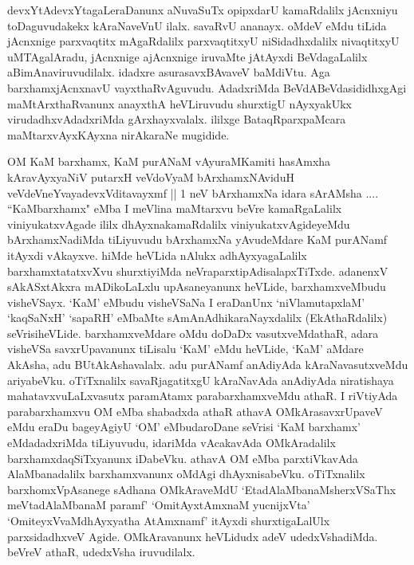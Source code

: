 \begin{artha}
devxYtAdevxYtagaLeraDanunx aNuvaSuTx opipxdarU kamaRdalilx jAcnxniyu toDaguvudakekx kAraNaveVnU ilalx. savaRvU ananayx. oMdeV eMdu tiLida jAcnxnige parxvaqtitx mAgaRdalilx parxvaqtitxyU niSidadhxdalilx nivaqtitxyU uMTAgalAradu, jAcnxnige \-ajAcnxnige iruvaMte jAtAyxdi BeVdagaLalilx aBimAnaviruvudilalx. idadxre asurasavxBAvaveV baMdiVtu. Aga barxhamxjAcnxnavU vayxthaRvAguvudu. AdadxriMda BeVdABeVdasididhxgAgi maMtArxthaRvanunx anayxthA heVLiruvudu shurxtigU nAyxyakUkx virudadhxvAdadxriMda gArxhayxvalalx. ililxge BataqRparxpaMcara maMtarxvAyxKAyxna nirAkaraNe mugidide.
\end{artha}


\begin{artha}
OM KaM barxhamx, KaM purANaM vAyuraMKamiti hasAmxha kAravAyxyaNiV putarxH veVdoVyaM bArxhamxNAviduH veVdeVneYvayadevxVditavayxmf || 1 neV bArxhamxNa idara sArAMsha .... ``KaMbarxhamx"  eMba I meVlina maMtarxvu beVre kamaRgaLalilx viniyukatxvAgade ililx dhAyxnakamaRdalilx viniyukatxvAgideyeMdu bArxhamxNadiMda tiLiyuvudu bArxhamxNa yAvudeMdare KaM purANamf itAyxdi vAkayxve. hiMde heVLida nAlukx adhAyxyagaLalilx barxhamxtatatxvXvu shurxtiyiMda neVraparxtipAdisalapxTiTxde. adanenxV sAkASxtAkxra mADikoLaLxlu upAsaneyanunx heVLide, barxhamxveMbudu visheVSayx. `KaM' eMbudu visheVSaNa I eraDanUnx `niVlamutapxlaM' `kaqSaNxH' `sapaRH' eMbaMte sAmAnAdhikaraNayxdalilx (EkAthaRdalilx) seVrisiheVLide. barxhamxveMdare oMdu doDaDx vasutxveMdathaR, adara visheVSa savxrUpavanunx tiLisalu `KaM' eMdu heVLide, `KaM' aMdare AkAsha, adu BUtAkAshavalalx. adu purANamf anAdiyAda kAraNavasutxveMdu ariyabeVku. oTiTxnalilx savaRjagatitxgU kAraNavAda anAdiyAda niratishaya mahatavxvuLaLxvasutx paramAtamx parabarxhamxveMdu athaR. I riVtiyAda parabarxhamxvu OM eMba shabadxda athaR athavA OMkArasavxrUpaveV eMdu eraDu bageyAgiyU `OM' eMbudaroDane seVrisi `KaM barxhamx' eMdadadxriMda tiLiyuvudu, idariMda vAcakavAda OMkAradalilx barxhamxdaqSiTxyanunx iDabeVku. athavA OM eMba parxtiVkavAda AlaMbanadalilx barxhamxvanunx oMdAgi dhAyxnisabeVku. oTiTxnalilx barxhomxVpAsanege sAdhana OMkAraveMdU `EtadAlaMbanaMsherxVSaThx meVtadAlaMbanaM paramf' `OmitAyxtAmxnaM yucnijxVta' `OmiteyxVvaMdhAyxyatha AtAmxnamf' itAyxdi shurxtigaLalUlx parxsidadhxveV Agide. OMkAravanunx heVLidudx adeV udedxVshadiMda. beVreV athaR, udedxVsha iruvudilalx.
\end{artha}

